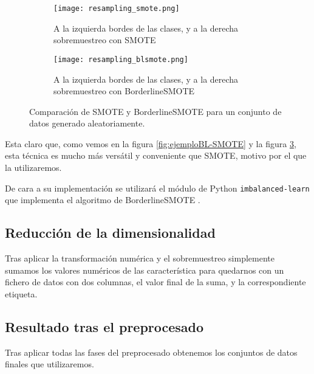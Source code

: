 \begin{figure}[H]
    \centering
	 \begin{subfigure}[b]{\textwidth}
		 \centering
		 \texttt{[image: resampling\_smote.png]}
		 \caption{A la izquierda bordes de las clases, y a la derecha sobremuestreo con SMOTE}
		 \label{fig:SMOTE-cmp}
	 \end{subfigure}

    \begin{subfigure}[b]{\textwidth}
		 \centering
		  \texttt{[image: resampling\_blsmote.png]}
        \caption{A la izquierda bordes de las clases, y a la derecha sobremuestreo con BorderlineSMOTE}
        \label{fig:BLSMOTE-cmp}
    \end{subfigure}

    \caption{Comparación de SMOTE y BorderlineSMOTE para un conjunto de datos generado aleatoriamente.}\label{fig:BLSMOTE-SMOTE}

\end{figure}

Esta claro que, como vemos en la figura \ref{fig:ejemploBL-SMOTE} y la figura \ref{fig:BLSMOTE-SMOTE}, esta técnica es mucho más versátil y conveniente que SMOTE, motivo por el que la utilizaremos.


De cara a su implementación se utilizará el módulo de Python \texttt{imbalanced-learn} que implementa el algoritmo de BorderlineSMOTE \cite{imblearnBLSMOTE}.


\subsection{Reducción de la dimensionalidad}

Tras aplicar la transformación numérica y el sobremuestreo simplemente sumamos los valores numéricos de las característica para quedarnos con un fichero de datos con dos columnas, el valor final de la suma, y la correspondiente etiqueta.


\subsection{Resultado tras el preprocesado}

Tras aplicar todas las fases del preprocesado obtenemos los conjuntos de datos finales que utilizaremos.
